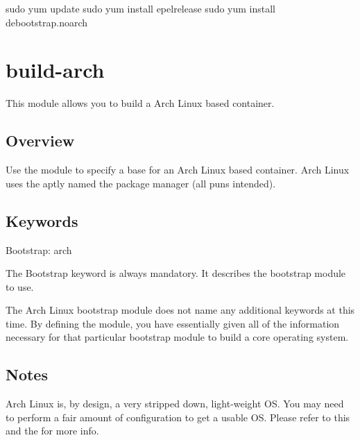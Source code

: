\documentclass[letterpaper,10pt,english]{sphinxmanual}
\begin{document}
%
\begin{sphinxVerbatim}[commandchars=\\\{\}]
\PYGZdl{} sudo yum update \PYGZam{}\PYGZam{} sudo yum install epel\PYGZhy{}release \PYGZam{}\PYGZam{} sudo yum install debootstrap.noarch
\end{sphinxVerbatim}


\section{build-arch}
\label{\detokenize{appendix:build-arch}}\label{\detokenize{appendix:id18}}\label{\detokenize{appendix:sec-build-arch}}
This module allows you to build a Arch Linux based container.


\subsection{Overview}
\label{\detokenize{appendix:id19}}
Use the  module to specify a base for an Arch Linux based container. Arch Linux uses the aptly named the  package manager (all puns intended).


\subsection{Keywords}
\label{\detokenize{appendix:id20}}
%
\begin{sphinxVerbatim}[commandchars=\\\{\}]
Bootstrap: arch
\end{sphinxVerbatim}

The Bootstrap keyword is always mandatory. It describes the bootstrap module to use.

The Arch Linux bootstrap module does not name any additional keywords at this time. By defining the  module, you have essentially given all of the
information necessary for that particular bootstrap module to build a core operating system.


\subsection{Notes}
\label{\detokenize{appendix:id21}}
Arch Linux is, by design, a very stripped down, light-weight OS. You may need to perform a fair amount of configuration to get a usable OS. Please refer
to this  and
the  for more info.
\end{document}
